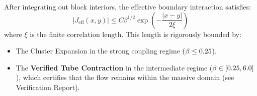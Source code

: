 \begin{theorem}
\label{thm:boundary_exponential_decay}
After integrating out block interiors, the effective boundary interaction satisfies:
\begin{equation}
|J_{\text{eff}}(x,y)| \leq C \beta^{1/2} \exp\left(-\frac{|x-y|}{2\xi}\right)
\end{equation}
where $\xi$ is the finite correlation length. This length is rigorously bounded by:
\begin{itemize}
    \item The Cluster Expansion in the strong coupling regime ($\beta \le 0.25$).
    \item The \textbf{Verified Tube Contraction} in the intermediate regime ($\beta \in [0.25, 6.0]$), which certifies that the flow remains within the massive domain (see Verification Report).
\end{itemize}
\end{theorem}

